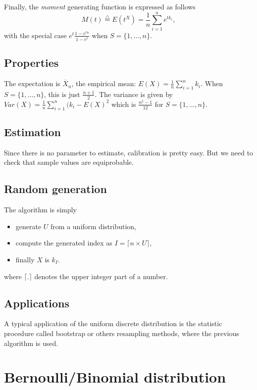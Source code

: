 Finally, the \emph{moment} generating function is expressed as follows
$$
M(t) \stackrel{\triangle}{=} E(t^X) = \frac{1}{n} \sum_{i=1}^n e^{tk_i},
$$
with the special case $e^t \frac{1-e^{tn}}{1-e^t}$ when $S=\{1,\dots,n\}$.


\subsection{Properties}
The expectation is $\overline X_n$, the empirical mean: $ E(X)=\frac{1}{n} \sum_{i=1}^n k_i$.
When $S=\{1,\dots,n\}$, this is just $\frac{n+1}{2}$. The variance is given by $Var(X)=\frac{1}{n} \sum_{i=1}^n (k_i-E(X)^2$ which is $\frac{n^2-1}{12}$ for $S=\{1,\dots,n\}$.

\subsection{Estimation}
Since there is no parameter to estimate, calibration is pretty easy. But we need to 
check that sample values are equiprobable.

\subsection{Random generation}
The algorithm is simply
\begin{itemize}
\item generate $U$ from a uniform distribution,
\item compute the generated index as $I = \lceil n\times U  \rceil$,
\item finally $X$ is $k_I$.
\end{itemize}
where $\lceil . \rceil$ denotes the upper integer part of a number.

\subsection{Applications}
A typical application of the uniform discrete distribution is the statistic procedure called bootstrap or others resampling methods, where the previous algorithm is used.

\section{Bernoulli/Binomial distribution}
